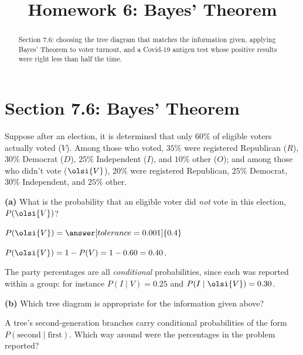 \documentclass[12pt]{ximera}
\title{Homework 6: Bayes' Theorem}
\begin{document}
\begin{abstract}
Section 7.6: choosing the tree diagram that matches the information given, applying
Bayes' Theorem to voter turnout, and a Covid-19 antigen test whose positive results were
right less than half the time.
\end{abstract}
\maketitle

\section*{Section 7.6: Bayes' Theorem}

\begin{problem}
Suppose after an election, it is determined that only $60\%$ of eligible voters
actually voted ($V$). Among those who voted, $35\%$ were registered Republican
($R$), $30\%$ Democrat ($D$), $25\%$ Independent ($I$), and $10\%$ other ($O$);
and among those who didn't vote ($\olsi{V}$), $20\%$ were registered Republican,
$25\%$ Democrat, $30\%$ Independent, and $25\%$ other.

\begin{prompt}
\textbf{(a)} What is the probability that an eligible voter did \emph{not} vote in this
election, $P\!\left(\olsi{V}\right)$?

$P\!\left(\olsi{V}\right)=\answer[tolerance=0.001]{0.4}$

\begin{feedback}
$P\!\left(\olsi{V}\right)=1-P(V)=1-0.60=0.40$.

The party percentages are all \emph{conditional} probabilities, since each was
reported within a group: for instance $P(I\mid V)=0.25$ and
$P\!\left(I\mid\olsi{V}\right)=0.30$.
\end{feedback}
\end{prompt}

\begin{prompt}
\textbf{(b)} Which tree diagram is appropriate for the information given above?

\begin{multipleChoice}
\end{multipleChoice}

\begin{hint}
A tree's second-generation branches carry conditional probabilities of the form
$P(\text{second}\mid\text{first})$. Which way around were the percentages in the
problem reported?
\end{hint}


\end{prompt}
\end{problem}
\end{document}
